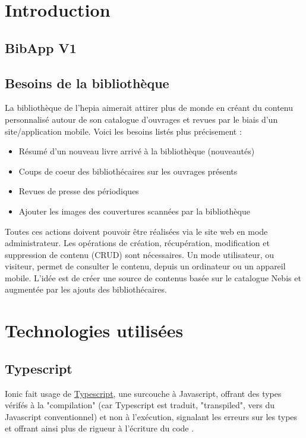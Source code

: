 \documentclass[a4paper, 12pt]{article}
\begin{document}
\newpage

\tableofcontents
\newpage
\listoffigures
\renewcommand\listoflistingscaption{Table des listings de code source}
\listoflistings
\newpage

\section{Introduction}
\subsection{BibApp V1}
\subsection{Besoins de la bibliothèque}
La bibliothèque de l'hepia aimerait attirer plus de monde en créant du contenu personnalisé autour de son
catalogue d'ouvrages et revues par le biais d'un site/application mobile. Voici les besoins listés plus
précisement :
\begin{itemize}
    \item Résumé d'un nouveau livre arrivé à la bibliothèque (nouveautés)
    \item Coups de coeur des bibliothécaires sur les ouvrages présents
    \item Revues de presse des périodiques
    \item Ajouter les images des couvertures scannées par la bibliothèque
\end{itemize}
Toutes ces actions doivent pouvoir être réalisées via le site web en mode administrateur. Les opérations de
création, récupération, modification et suppression de contenu (CRUD) sont nécessaires. Un mode utilisateur, ou visiteur,
permet de consulter le contenu, depuis un ordinateur ou un appareil mobile. L'idée est de créer une source
de contenus basée sur le catalogue Nebis et augmentée par les ajouts des bibliothécaires.

\section{Technologies utilisées}

\subsection{Typescript}
Ionic fait usage de \href{http://www.typescriptlang.org/}{Typescript}, une surcouche à Javascript, offrant des types
vérifés à la "compilation" (car Typescript est traduit, "transpiled", vers du Javascript conventionnel) et non à
l'exécution, signalant les erreurs sur les types et offrant ainsi plus de rigueur à l'écriture du code \cite{ref12}.
\end{document}
